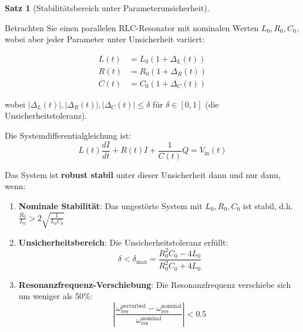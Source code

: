 \documentclass[a4paper, 12pt, twoside, openright]{report}
\theoremstyle{definition}
\theoremstyle{definition}
\newtheorem{satz}{Satz}[chapter]
\begin{document}
\begin{satz}[Stabilitätsbereich unter Parameterunsicherheit]
\label{satz:stabilitaet_unsicherheit}

Betrachten Sie einen parallelen RLC-Resonator mit nominalen Werten $L_0, R_0, C_0$, wobei aber jeder Parameter unter Unsicherheit variiert:

\begin{align}
L(t) &= L_0 (1 + \Delta_L(t)) \\
R(t) &= R_0 (1 + \Delta_R(t)) \\
C(t) &= C_0 (1 + \Delta_C(t))
\end{align}

wobei $|\Delta_L(t)|, |\Delta_R(t)|, |\Delta_C(t)| \leq \delta$ für $\delta \in [0,1]$ (die Unsicherheitstoleranz).

Die Systemdifferentialgleichung ist:
\begin{equation}
L(t) \frac{dI}{dt} + R(t) I + \frac{1}{C(t)} Q = V_{\text{in}}(t)
\end{equation}

Das System ist \textbf{robust stabil} unter dieser Unsicherheit dann und nur dann, wenn:

\begin{enumerate}
    \item \textbf{Nominale Stabilität}: Das ungestörte System mit $L_0, R_0, C_0$ ist stabil, d.h. $\frac{R_0}{L_0} > 2\sqrt{\frac{1}{L_0 C_0}}$
    
    \item \textbf{Unsicherheitsbereich}: Die Unsicherheitstoleranz erfüllt:
    \begin{equation}
    \delta < \delta_{\max} = \frac{R_0^2 C_0 - 4L_0}{R_0^2 C_0 + 4L_0}
    \end{equation}
    
    \item \textbf{Resonanzfrequenz-Verschiebung}: Die Resonanzfrequenz verschiebe sich um weniger als 50\%:
    \begin{equation}
    \left| \frac{\omega_{\text{res}}^{\text{perturbed}} - \omega_{\text{res}}^{\text{nominal}}}{\omega_{\text{res}}^{\text{nominal}}} \right| < 0.5
    \end{equation}
\end{enumerate}

\end{satz}
\end{document}

